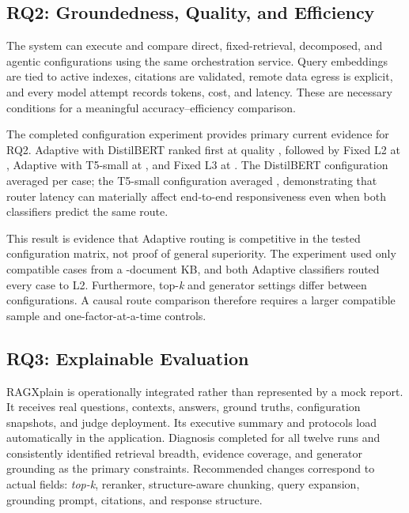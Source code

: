 \subsection{RQ2: Groundedness, Quality, and Efficiency}

The system can execute and compare direct, fixed-retrieval, decomposed, and
agentic configurations using the same orchestration service. Query embeddings
are tied to active indexes, citations are validated, remote data egress is
explicit, and every model attempt records tokens, cost, and latency. These are
necessary conditions for a meaningful accuracy--efficiency comparison.

The completed configuration experiment provides primary current evidence for
RQ2. Adaptive with DistilBERT ranked first at quality
\DistilConfigQuality{}, followed by Fixed L2 at \LTwoConfigQuality{}, Adaptive
with T5-small at \TFiveConfigQuality{}, and Fixed L3 at
\LThreeConfigQuality{}. The DistilBERT configuration averaged
\DistilConfigLatency{} per case; the T5-small configuration averaged
\TFiveConfigLatency{}, demonstrating that router latency can materially affect
end-to-end responsiveness even when both classifiers predict the same route.

This result is evidence that Adaptive routing is competitive in the tested
configuration matrix, not proof of general superiority. The experiment used
only \PrimaryExperimentCases{} compatible cases from a
\PrimaryExperimentKBDocuments-document KB, and both Adaptive classifiers routed
every case to L2. Furthermore, top-\textit{k} and generator settings differ
between configurations. A causal route comparison therefore requires a larger
compatible sample and one-factor-at-a-time controls.

\subsection{RQ3: Explainable Evaluation}

RAGXplain is operationally integrated rather than represented by a mock report.
It receives real questions, contexts, answers, ground truths, configuration
snapshots, and judge deployment. Its executive summary and protocols load
automatically in the application. Diagnosis completed for all twelve runs and
consistently identified retrieval breadth, evidence coverage, and generator
grounding as the primary constraints. Recommended changes correspond to actual
fields: \textit{top-k}, reranker, structure-aware chunking, query expansion,
grounding prompt, citations, and response structure.


